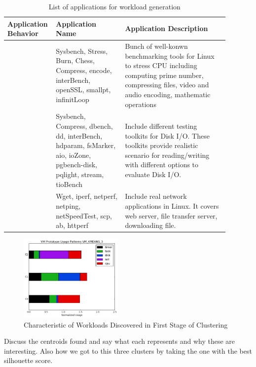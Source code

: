 \documentclass[10pt, conference, compsocconf]{IEEEtran}
\begin{document}
\begin{table}
\caption{List of applications for workload generation}
\centering
\begin{tabular}{M{0.14\linewidth}M{0.30\linewidth}M{0.45\linewidth}}
  \hline
  \footnotesize \textbf{Application Behavior} & \footnotesize \textbf{Application Name} & \footnotesize \textbf{Application Description} \\
  \hline
  \hline
    \footnotesize {} & \footnotesize Sysbench, Stress, Burn, Chess, Compress, encode, interBench, openSSL, smallpt, infinitLoop  & Bunch of well-konwn benchmarking tools for Linux to stress CPU including computing prime number, compressing files, video and audio encoding, mathematic operations \\  \hline
  \footnotesize  {} & \footnotesize Sysbench, Compress, dbench, dd, interBench, hdparam, fsMarker, aio, ioZone, pgbench-disk, pqlight, stream, tioBench & Include different testing toolkits for Disk I/O. These toolkits provide realistic scenario for reading/writing with different options to evaluate Disk I/O.  \\  \hline
   \footnotesize  {} & \footnotesize  Wget, iperf, netperf, netping, netSpeedTest, scp, ab, httperf & Include real network applications in Linux. It covers web server, file transfer server, downloading file.    \\
  \hline
\end{tabular}
\label{tab:notation}
\end{table}

\begin{figure}[!htpb]
\centering
\includegraphics[width=0.45\textwidth]{figs/VM_KMEANS_3_centroids.png}
\caption{Characteristic of Workloads Discovered in First Stage of Clustering}
\label{fig:1st-centroids}
\end{figure}
Discuss the centroids found and say what each represents and why these are interesting. Also how we got to this three clusters by taking the one with the best silhouette score. 
\end{document}
